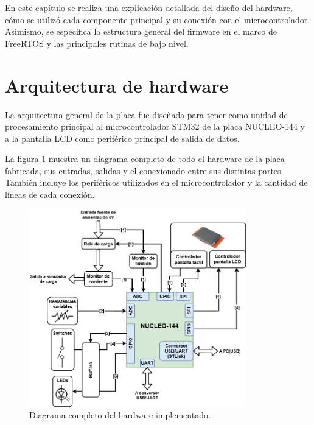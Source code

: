 
En este capítulo se realiza una explicación detallada del diseño del hardware, cómo se utilizó cada componente principal y su conexión con el microcontrolador. Asimismo, se especifica la estructura general del firmware en el marco de FreeRTOS y las principales rutinas de bajo nivel.


\section{Arquitectura de hardware}

La arquitectura general de la placa fue diseñada para tener como unidad de procesamiento principal al microcontrolador STM32 de la placa NUCLEO-144 y a la pantalla LCD como periférico principal de salida de datos.

La figura \ref{fig:estrucInt} muestra un diagrama completo de todo el hardware de la placa fabricada, sus entradas, salidas y el conexionado entre sus distintas partes. También incluye los periféricos utilizados en el microcontrolador y la cantidad de líneas de cada conexión.

\begin{figure}[H]
\centering
\includegraphics[width=0.84\textwidth]{./Figures/diagDisp.png}
\caption{Diagrama completo del hardware implementado.}
\label{fig:estrucInt}
\end{figure}

